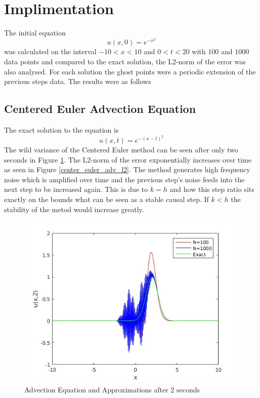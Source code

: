\section{Implimentation}
The initial equation
\begin{equation}
  u(x,0) = e^{-x^2}
\end{equation}
was calculated on the interval $-10<x<10$ and $0<t<20$ with $100$ and $1000$ data points and compared to the exact solution, the L2-norm of the error was also analysed. For each solution the ghost points were a periodic extension of the previous steps data. The results were as follows
\subsection{Centered Euler Advection Equation}
The exact solution to the equation is
\begin{equation}
u(x,t) = e^{-(x-t)^2}
\end{equation}
The wild variance of the Centered Euler method can be seen after only two seconds in Figure \ref{center_euler_adv}. The L2-norm of the error exponentially increases over time as seen in Figure \ref{center_euler_adv_l2}. The method generates high frequency noise which is amplified over time and the previous step's noise feeds into the next step to be increased again. This is due to $k=h$ and how this step ratio sits exactly on the bounds what can be seen as a stable causal step. If $k<h$ the stability of the metod would increase greatly.
\begin{figure}[H] 
 \includegraphics[scale=0.5]{Images/center_euler_adv.jpg}
 \caption{Advection Equation and Approximations after 2 seconds}
 \label{center_euler_adv}
\end{figure}
